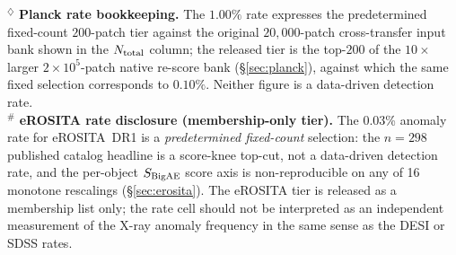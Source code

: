 \documentclass[aps,prd,twocolumn,superscriptaddress,showpacs,preprintnumbers,nofootinbib,longbibliography,floatfix]{revtex4-2}
\begin{document}
{$^{\diamondsuit}$ \textbf{Planck rate bookkeeping.} The $1.00\%$ rate expresses the predetermined fixed-count $200$-patch tier against the original $20{,}000$-patch cross-transfer input bank shown in the $N_{\rm total}$ column; the released tier is the top-$200$ of the $10\times$ larger $2\times10^{5}$-patch native re-score bank (\S\ref{sec:planck}), against which the same fixed selection corresponds to $0.10\%$. Neither figure is a data-driven detection rate.\\
$^\#$ \textbf{eROSITA rate disclosure (membership-only tier).} The 0.03\% anomaly rate for eROSITA~DR1 is a \emph{predetermined fixed-count} selection: the $n = 298$ published catalog headline is a score-knee top-cut, not a data-driven detection rate, and the per-object $S_{\rm BigAE}$ score axis is non-reproducible on any of 16 monotone rescalings (\S\ref{sec:erosita}). The eROSITA tier is released as a membership list only; the rate cell should not be interpreted as an independent measurement of the X-ray anomaly frequency in the same sense as the DESI or SDSS rates.\\
}
\end{document}
